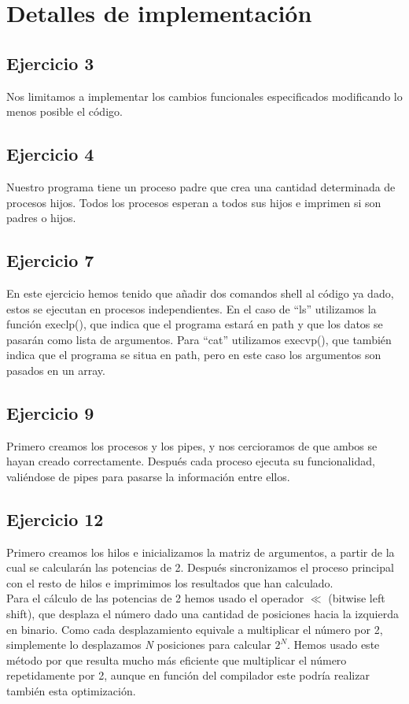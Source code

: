 \documentclass[]{article}
\begin{document}
\section*{Detalles de implementación}
\subsection*{Ejercicio 3}
Nos limitamos a implementar los cambios funcionales especificados modificando lo menos posible el código.

\subsection*{Ejercicio 4}
Nuestro programa tiene un proceso padre que crea una cantidad determinada de procesos hijos. Todos los procesos esperan a todos sus hijos e imprimen si son padres o hijos.

\subsection*{Ejercicio 7}
En este ejercicio hemos tenido que añadir dos comandos shell al código ya dado, estos se ejecutan en procesos independientes. En el caso de ``ls'' utilizamos la función execlp(), que indica que el programa estará en path y que los datos se pasarán como lista de argumentos. Para ``cat'' utilizamos execvp(), que también indica que el programa se situa en path, pero en este caso los argumentos son pasados en un array.

\subsection*{Ejercicio 9}
Primero creamos los procesos y los pipes, y nos cercioramos de que ambos se hayan creado correctamente. Después cada proceso ejecuta su funcionalidad, valiéndose de pipes para pasarse la información entre ellos.

\subsection*{Ejercicio 12}
Primero creamos los hilos e inicializamos la matriz de argumentos, a partir de la cual se calcularán las potencias de 2. Después sincronizamos el proceso principal con el resto de hilos e imprimimos los resultados que han calculado. \\

Para el cálculo de las potencias de 2 hemos usado el operador $\ll$ (bitwise left shift), que desplaza el número dado una cantidad de posiciones hacia la izquierda en binario. Como cada desplazamiento equivale a multiplicar el número por 2, simplemente lo desplazamos \textit{N} posiciones para calcular \textit{$2^N$}. Hemos usado este método por que resulta mucho más eficiente que multiplicar el número repetidamente por 2, aunque en función del compilador este podría realizar también esta optimización.
\end{document}

